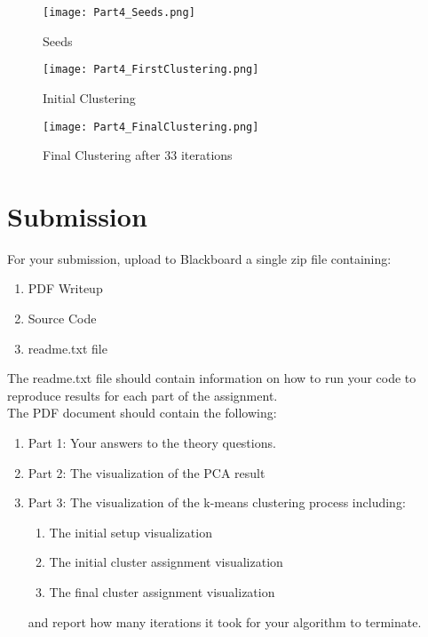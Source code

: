 \documentclass[12pt]{article}
\begin{document}
\begin{figure}[H]
\begin{center}
\texttt{[image: Part4\_Seeds.png]}
\caption{Seeds}
\label{kMeans1}
\end{center}
\end{figure}

\begin{figure}[H]
\begin{center}
\texttt{[image: Part4\_FirstClustering.png]}
\caption{Initial Clustering}
\label{kMeans2}
\end{center}
\end{figure}

\begin{figure}[H]
\begin{center}
\texttt{[image: Part4\_FinalClustering.png]}
\caption{Final Clustering after 33 iterations}
\label{kMeans3}
\end{center}
\end{figure}


\newpage
\section*{Submission}
For your submission, upload to Blackboard a single zip file containing:

\begin{enumerate}
\item PDF Writeup
\item Source Code
\item readme.txt file
\end{enumerate}

\noindent
The readme.txt file should contain information on how to run your code to reproduce results for each part of the assignment.\\

\noindent
The PDF document should contain the following:
\begin{enumerate}
\item Part 1: Your answers to the theory questions.
\item Part 2: The visualization of the PCA result
\item Part 3: The visualization of the k-means clustering process including:
    \begin{enumerate}
    \item The initial setup visualization
    \item The initial cluster assignment visualization
    \item The final cluster assignment visualization
    \end{enumerate}
    and report how many iterations it took for your algorithm to terminate.
\end{enumerate}
\end{document}
